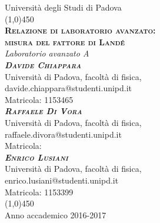 
\begin{titlepage}

\begin{center}
\LARGE{Università degli Studi di Padova}\\
\line(1,0){450}\\
\vspace{1em}
\Huge{\textsc{\textbf{Relazione di laboratorio avanzato:\\ misura del fattore di Land\'e}}}\\
\vspace{2em}
\LARGE{\textit{Laboratorio avanzato A}}\\
\vspace{4em}
\huge{\textbf\textsc\textit{{{Davide Chiappara}}}}\\
\vspace{0.5em}
\normalsize{Università di Padova, facoltà di fisica,}\\
\normalsize{davide.chiappara@studenti.unipd.it}\\
\normalsize{Matricola: 1153465}\\
\vspace{1em}
\huge{\textbf\textsc\textit{{{Raffaele Di Vora}}}}\\
\vspace{0.5em}
\normalsize{Università di Padova, facoltà di fisica,}\\
\normalsize{raffaele.divora@studenti.unipd.it}\\
\normalsize{Matricola: }\\
\vspace{1em}
\huge{\textbf\textsc\textit{{{Enrico Lusiani}}}}\\
\vspace{0.5em}
\normalsize{Università di Padova, facoltà di fisica,}\\
\normalsize{enrico.lusiani@studenti.unipd.it}\\
\normalsize{Matricola: 1153399}\\
\vfill
\line(1,0){450}\\
\LARGE{Anno accademico 2016-2017}
\end{center}

\end{titlepage}

